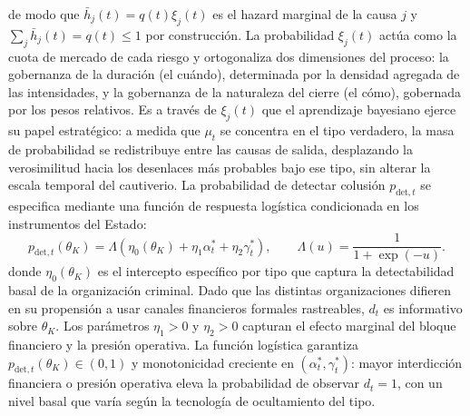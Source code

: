 \documentclass[pdflatex,sn-mathphys-ay]{sn-jnl}
\theoremstyle{thmstyleone}
\theoremstyle{thmstyletwo}
\theoremstyle{thmstylethree}
\newcommand{\1}{\mathbf{1}}
\begin{document}
de modo que $\bar h_j(t)=q(t)\xi_j(t)$ es el hazard marginal de la causa $j$ y $\sum_j \bar h_j(t)=q(t)\leq 1$ por construcción. La probabilidad $\xi_j(t)$ actúa como la cuota de mercado de cada riesgo y ortogonaliza dos dimensiones del proceso: la gobernanza de la duración (el cuándo), determinada por la densidad agregada de las intensidades, y la gobernanza de la naturaleza del cierre (el cómo), gobernada por los pesos relativos. Es a través de $\xi_j(t)$ que el aprendizaje bayesiano ejerce su papel estratégico: a medida que $\mu_t$ se concentra en el tipo verdadero, la masa de probabilidad se redistribuye entre las causas de salida, desplazando la verosimilitud hacia los desenlaces más probables bajo ese tipo, sin alterar la escala temporal del cautiverio. La probabilidad de detectar colusión $p_{\mathrm{det},t}$ se especifica mediante una función de respuesta logística condicionada en los instrumentos del Estado:
\begin{equation}
p_{\mathrm{det},t}(\theta_K)=\Lambda(\eta_0(\theta_K)+\eta_1\alpha_t^\ast+\eta_2\gamma_t^\ast),\qquad\Lambda(u)=\frac{1}{1+\exp(-u)}.
\label{eq:detection}
\end{equation}
donde $\eta_0(\theta_K)$ es el intercepto específico por tipo que captura la detectabilidad basal de la organización criminal. Dado que las distintas organizaciones difieren en su propensión a usar canales financieros formales rastreables, $d_t$ es informativo sobre $\theta_K$. Los parámetros $\eta_1>0$ y $\eta_2>0$ capturan el efecto marginal del bloque financiero y la presión operativa. La función logística garantiza $p_{\mathrm{det},t}(\theta_K)\in(0,1)$ y monotonicidad creciente en $(\alpha_t^\ast,\gamma_t^\ast)$: mayor interdicción financiera o presión operativa eleva la probabilidad de observar $d_t=1$, con un nivel basal que varía según la tecnología de ocultamiento del tipo.
\end{document}
